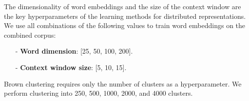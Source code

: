 The dimensionality of word embeddings and the size of the context window are the key hyperparameters of the learning methods for distributed representations. We use all combinations of the following values to train word embeddings on the combined corpus:
\begin{itemize}\small
\item[-]\textbf{Word dimension}: [25, 50, 100, 200].
\item[-]\textbf{Context window size}: [5, 10, 15].
\end{itemize}
Brown clustering requires only the number of clusters as a hyperparameter. We perform clustering into 250, 500, 1000, 2000, and 4000 clusters. 
%
%
%
%
%
% 
%
